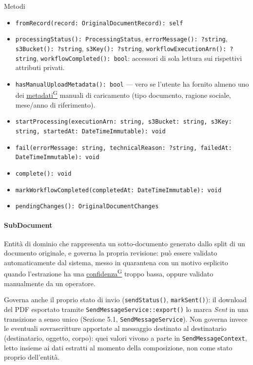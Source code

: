\documentclass[a4paper,12pt]{article}
\providecommand{\glslink}[2]{\href{https://alittlebyte-19.github.io/Documentazione/glossario.html\#gls-#1}{\underline{#2}\textsuperscript{\scriptsize G}}}
\begin{document}
\begin{sloppypar}
Metodi
\begin{itemize}\raggedright
    \item \texttt{fromRecord(record: OriginalDocumentRecord): self}
    \item \texttt{processingStatus(): ProcessingStatus}, \texttt{errorMessage(): ?string}, \texttt{s3Bucket(): ?string}, \texttt{s3Key(): ?string}, \texttt{workflowExecutionArn(): ?string}, \texttt{workflowCompleted(): bool}: accessori di sola lettura sui rispettivi attributi privati.
    \item \texttt{hasManualUploadMetadata(): bool} --- vero se l'utente ha fornito almeno uno dei \glslink{metadati}{metadati} manuali di caricamento (tipo documento, ragione sociale, mese/anno di riferimento).
    \item \texttt{startProcessing(executionArn: string, s3Bucket: string, s3Key: string, startedAt: DateTimeImmutable): void}
    \item \texttt{fail(errorMessage: string, technicalReason: ?string, failedAt: DateTimeImmutable): void}
    \item \texttt{complete(): void}
    \item \texttt{markWorkflowCompleted(completedAt: DateTimeImmutable): void}
    \item \texttt{pendingChanges(): OriginalDocumentChanges}
\end{itemize}

\paragraph{SubDocument}

Entità di dominio che rappresenta un sotto-documento generato dallo split di un documento originale, e governa la propria revisione: può essere validato automaticamente dal sistema, messo in quarantena con un motivo esplicito quando l'estrazione ha una \glslink{confidenza-confidence-score}{confidenza} troppo bassa, oppure validato manualmente da un operatore.

Governa anche il proprio stato di invio (\texttt{sendStatus()}, \texttt{markSent()}): il download del PDF esportato tramite \texttt{SendMessageService::export()} lo marca \textit{Sent} in una transizione a senso unico (Sezione 5.1, \texttt{SendMessageService}). Non governa invece le eventuali sovrascritture apportate al messaggio destinato al destinatario (destinatario, oggetto, corpo): quei valori vivono a parte in \texttt{SendMessageContext}, letto insieme ai dati estratti al momento della composizione, non come stato proprio dell'entità.


\end{sloppypar}
\end{document}
